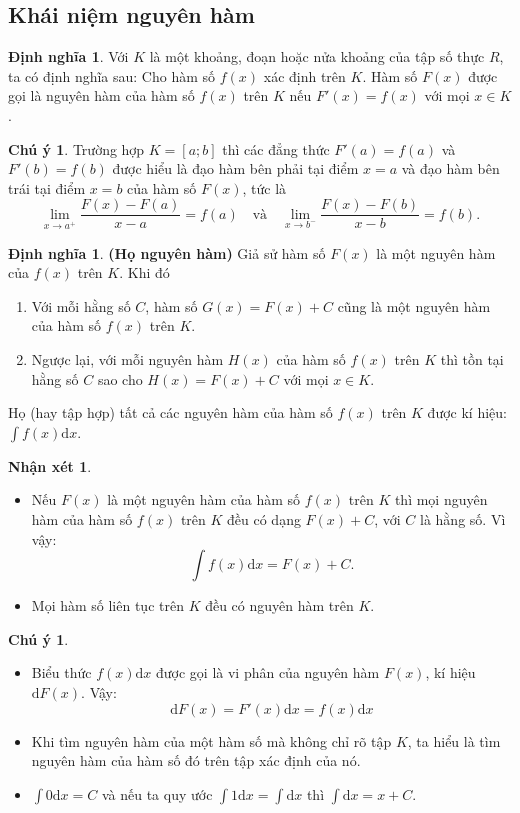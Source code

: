 \documentclass[12pt,a4paper,oneside]{book}
\theoremstyle{theorem}
\theoremstyle{definition}
\newtheorem{dn}[theorem2]{Định nghĩa}
\newtheorem{nx}[theorem2]{Nhận xét}
\newtheorem{cy}[theorem2]{Chú ý}
\begin{document}
   \subsection{Khái niệm nguyên hàm}
    \begin{dn}
       Với $K$ là một khoảng, đoạn hoặc nửa khoảng của tập số thực $R$, ta có định nghĩa sau:
       \noindent Cho hàm số $f(x)$ xác định trên $K$. Hàm số $F(x)$ được gọi là nguyên hàm của hàm số $f(x)$ trên $K$ nếu $F'(x) = f(x)$ với mọi $x \in K$.
   \end{dn}
    \begin{cy}
      Trường hợp $K = [a; b]$ thì các đẳng thức $F'(a) = f(a)$ và $F'(b) = f(b)$ được hiểu là đạo hàm bên phải tại điểm $x = a$ và đạo hàm bên trái tại điểm $x = b$ của hàm số $F(x)$, tức là
\[
\lim_{x \to a^+} \frac{F(x) - F(a)}{x - a} = f(a) \quad \text{và} \quad \lim_{x \to b^-} \frac{F(x) - F(b)}{x - b} = f(b).
\]
    \end{cy}
    \begin{dn}
     \textbf{(Họ nguyên hàm)}
\noindent Giả sử hàm số $F(x)$ là một nguyên hàm của $f(x)$ trên $K$. Khi đó
    \begin{enumerate}
    \item[a)] Với mỗi hằng số $C$, hàm số $G(x) = F(x) + C$ cũng là một nguyên hàm của hàm số $f(x)$ trên $K$.
    \item[b)] Ngược lại, với mỗi nguyên hàm $H(x)$ của hàm số $f(x)$ trên $K$ thì tồn tại hằng số $C$ sao cho $H(x) = F(x) + C$ với mọi $x \in K$.
    \end{enumerate}
 \end{dn}
\noindent Họ (hay tập hợp) tất cả các nguyên hàm của hàm số $f(x)$ trên $K$ được kí hiệu: $\int f(x)\mathrm{d}x$.
\begin{nx}
\leavevmode
    \begin{itemize}
        \item  Nếu $F(x)$ là một nguyên hàm của hàm số $f(x)$ trên $K$ thì mọi nguyên hàm của hàm số $f(x)$ trên $K$ đều có dạng $F(x) + C$, với $C$ là hằng số. Vì vậy:
\[
\int f(x)\mathrm{d}x = F(x) + C.
\]
\item Mọi hàm số liên tục trên $K$ đều có nguyên hàm trên $K$.
    \end{itemize}
\end{nx}
\begin{cy}
\leavevmode
\begin{itemize}
      \item Biểu thức $f(x)\mathrm{d}x$ được gọi là vi phân của nguyên hàm $F(x)$, kí hiệu $\mathrm{d}F(x)$. Vậy:
    \[
    \mathrm{d}F(x) = F'(x)\mathrm{d}x = f(x)\mathrm{d}x
    \]
    \item Khi tìm nguyên hàm của một hàm số mà không chỉ rõ tập $K$, ta hiểu là tìm nguyên hàm của hàm số đó trên tập xác định của nó.
    \item $\int 0\mathrm{d}x = C$ và nếu ta quy ước $\int 1\mathrm{d}x = \int \mathrm{d}x$ thì $\int \mathrm{d}x = x + C$.
\end{itemize}
 \end{cy}
\end{document}
